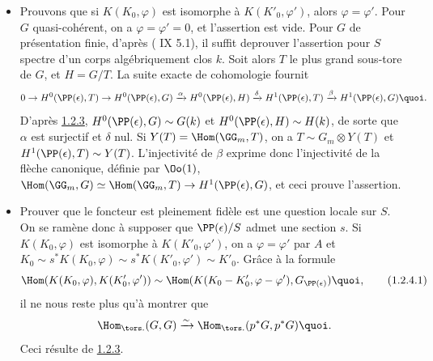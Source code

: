 \begin{itemize} 
\item[A.] Prouvons que si $K(K_{0},\varphi)$ est isomorphe à
$K(K'_0,\varphi')$, alors $\varphi=\varphi'$. Pour $G$
quasi-cohérent, on a $\varphi=\varphi'=0$, et l'assertion est
vide. Pour $G$ de présentation finie, d'après ( IX 5.1), il
suffit de\pageoriginale prouver l'assertion pour $S$ spectre d'un
corps algébriquement clos $k$. Soit alors $T$ le plus grand sous-tore
de $G$, et $H=G/T$. La suite exacte de cohomologie fournit
$$
0\rightarrow H^{0}(\PP(\epsilon),T)\rightarrow
H^{0}(\PP(\epsilon),G) \xrightarrow{\alpha}
H^{0}(\PP(\epsilon),H)
 \xrightarrow{\delta}
H^{1}(\PP(\epsilon),T)\xrightarrow{\beta}H^{1}(\PP(\epsilon),G){\quoi}.
$$
D'après \hyperref[XVIII.lem1.2.3]{1.2.3}, $H^0(\PP(\epsilon),G)\sim G(k)$ et
$H^0(\PP(\epsilon),H)\sim H(k)$, de sorte que $\alpha$
est surjectif et $\delta$ nul. Si $Y(T)=\Hom(\GG_{m},T)$, on a
$T\sim G_{m}\otimes Y(T)$ et $H^{1}(\PP(\epsilon),T)\sim
Y(T)$. L'injectivité de $\beta$ exprime donc l'injectivité de la
flèche canonique, définie par $\Oo(1)$,
$\Hom(\GG_{m},G)\simeq \Hom(\GG_{m},T)\rightarrow
H^{1}(\PP(\epsilon),G)$, et ceci prouve l'assertion.

\item[B.] Prouver que le foncteur  est pleinement fidèle est
  une question locale sur $S$. On se ramène donc à supposer que
  $\PP(\epsilon)/S$ admet une section $s$.
  Si $K(K_{0},\varphi)$
  est isomorphe à $K(K'_{0},\varphi')$, on a $\varphi=\varphi'$ par
  $A$ et $K_{0}\sim s^{\ast}K(K_{0},\varphi)\sim
  s^{\ast}K(K'_{0},\varphi')\sim K'_{0}$. Grâce à la formule
\begin{equation*}
\Hom (K(K_{0},\varphi), K(K'_{0},\varphi'))\sim \Hom(K(K_{0}-K'_{0},\varphi-\varphi'),G_{\PP(\epsilon)}){\quoi},\tag{1.2.4.1}
\end{equation*}%
il ne nous reste plus qu'à montrer que
$$
\Hom_{\tors.}(G,G)\xrightarrow{\sim}
\Hom_{\tors.}(p^{\ast}G,p^{\ast}G){\quoi}.
$$
Ceci résulte de \hyperref[XVIII.lem1.2.3]{1.2.3}.
\end{itemize}

\setcounter{subsubsection}{4}
\subsubsection{}

